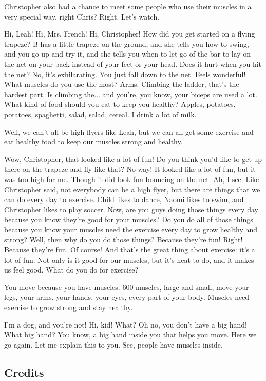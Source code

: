 Christopher also had a chance to meet some people who use their muscles in a very special way, right Chris?
Right. Let's watch.

Hi, Leah!
Hi, Mrs. French!
Hi, Christopher!
How did you get started on a flying trapeze?
B has a little trapeze on the ground, and she tells you how to swing, and you go up and try it, and she tells you when to let go of the bar to lay on the net on your back instead of your feet or your head.
Does it hurt when you hit the net?
No, it's exhilarating. You just fall down to the net. Feels wonderful!
What muscles do you use the most?
Arms. Climbing the ladder, that's the hardest part. Is climbing the... and you're, you know, your biceps are used a lot.
What kind of food should you eat to keep you healthy?
Apples, potatoes, potatoes, spaghetti, salad, salad, cereal. I drink a lot of milk.

Well, we can't all be high flyers like Leah, but we can all get some exercise and eat healthy food to keep our muscles strong and healthy.

Wow, Christopher, that looked like a lot of fun! Do you think you'd like to get up there on the trapeze and fly like that?
No way! It looked like a lot of fun, but it was too high for me. Though it did look fun bouncing on the net.
Ah, I see. Like Christopher said, not everybody can be a high flyer, but there are things that we can do every day to exercise. Child likes to dance, Naomi likes to swim, and Christopher likes to play soccer. Now, are you guys doing those things every day because you know they're good for your muscles? Do you do all of those things because you know your muscles need the exercise every day to grow healthy and strong?
Well, then why do you do those things?
Because they're fun!
Right! Because they're fun. Of course! And that's the great thing about exercise: it's a lot of fun. Not only is it good for our muscles, but it's neat to do, and it makes us feel good. What do you do for exercise?

You move because you have muscles. 600 muscles, large and small, move your legs, your arms, your hands, your eyes, every part of your body. Muscles need exercise to grow strong and stay healthy.

I'm a dog, and you're not!
Hi, kid!
What? Oh no, you don't have a big hand!
What big hand?
You know, a big hand inside you that helps you move.
Here we go again. Let me explain this to you. See, people have muscles inside.

\subsection{Credits}